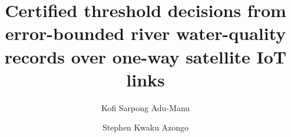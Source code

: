\documentclass[preprint,12pt,authoryear]{elsarticle}
\begin{document}
\begin{frontmatter}

\title{Certified threshold decisions from error-bounded river water-quality records over one-way satellite IoT links}

\author[ug]{Kofi Sarpong Adu-Manu}
\author[ug]{Stephen Kwaku Azongo}



\end{frontmatter}











\end{document}
